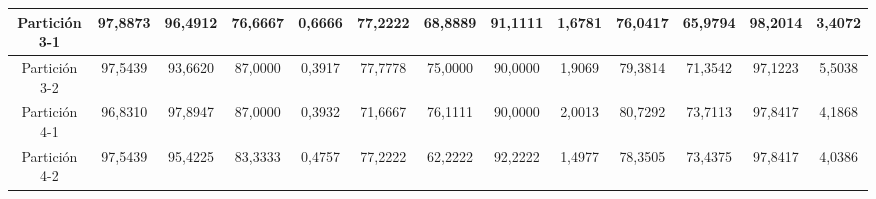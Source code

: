 \documentclass[12pt]{article}
\begin{document}
\begin{table}[H]
{\begin{tabular}{|c|cccc|cccc|cccc|}
Partición 3-1 & \multicolumn{1}{c|}{97,8873}                                                  & \multicolumn{1}{c|}{96,4912}                                                 & \multicolumn{1}{c|}{76,6667} & 0,6666 & \multicolumn{1}{c|}{77,2222}                                                  & \multicolumn{1}{c|}{68,8889}                                                 & \multicolumn{1}{c|}{91,1111} & 1,6781 & \multicolumn{1}{c|}{76,0417}                                                  & \multicolumn{1}{c|}{65,9794}                                                 & \multicolumn{1}{c|}{98,2014} & 3,4072 \\ \hline
Partición 3-2 & \multicolumn{1}{c|}{97,5439}                                                  & \multicolumn{1}{c|}{93,6620}                                                 & \multicolumn{1}{c|}{87,0000} & 0,3917 & \multicolumn{1}{c|}{77,7778}                                                  & \multicolumn{1}{c|}{75,0000}                                                 & \multicolumn{1}{c|}{90,0000} & 1,9069 & \multicolumn{1}{c|}{79,3814}                                                  & \multicolumn{1}{c|}{71,3542}                                                 & \multicolumn{1}{c|}{97,1223} & 5,5038 \\ \hline
Partición 4-1 & \multicolumn{1}{c|}{96,8310}                                                  & \multicolumn{1}{c|}{97,8947}                                                 & \multicolumn{1}{c|}{87,0000} & 0,3932 & \multicolumn{1}{c|}{71,6667}                                                  & \multicolumn{1}{c|}{76,1111}                                                 & \multicolumn{1}{c|}{90,0000} & 2,0013 & \multicolumn{1}{c|}{80,7292}                                                  & \multicolumn{1}{c|}{73,7113}                                                 & \multicolumn{1}{c|}{97,8417} & 4,1868 \\ \hline
Partición 4-2 & \multicolumn{1}{c|}{97,5439}                                                  & \multicolumn{1}{c|}{95,4225}                                                 & \multicolumn{1}{c|}{83,3333} & 0,4757 & \multicolumn{1}{c|}{77,2222}                                                  & \multicolumn{1}{c|}{62,2222}                                                 & \multicolumn{1}{c|}{92,2222} & 1,4977 & \multicolumn{1}{c|}{78,3505}                                                  & \multicolumn{1}{c|}{73,4375}                                                 & \multicolumn{1}{c|}{97,8417} & 4,0386 \\ \hline

\end{tabular}}
\end{table}
\end{document}
